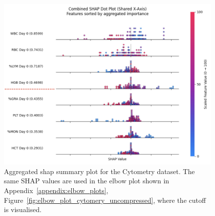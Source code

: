\documentclass[12pt,a4paper]{report}
\begin{document}
\begin{figure}[h!]
    \centering
    \includegraphics[width=0.9\linewidth]{images/Aggregated_SHAP_cytometry_uncompressed.png}
    \caption[Aggregated SHAP plot for Cytometry]{Aggregated \gls{shap} summary plot for the Cytometry dataset. The same SHAP values are used in the elbow plot shown in Appendix~\ref{appendix:elbow_plots}, Figure~\ref{fig:elbow_plot_cytomery_uncompressed}, where the cutoff is visualised.}
    \label{fig:cytometry_aggregated_shap}
\end{figure}
\end{document}
